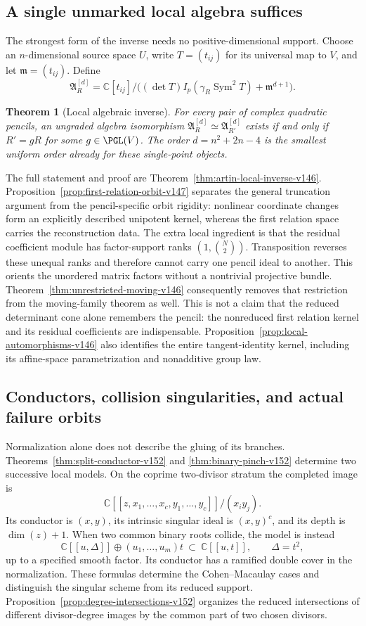 \documentclass[11pt,reqno]{amsart}
\numberwithin{equation}{section}
\newtheorem{theorem}{Theorem}[section]
\theoremstyle{definition}\newtheorem{definition}[theorem]{Definition}
\theoremstyle{remark}\newtheorem{remark}[theorem]{Remark}
\newcommand{\C}{\mathbb C}\newcommand{\Q}{\mathbb Q}
\DeclareMathOperator{\Sym}{Sym}\DeclareMathOperator{\Gr}{Gr}
\begin{document}
\subsection{A single unmarked local algebra suffices}
The strongest form of the inverse needs no positive-dimensional support.
Choose an \(n\)-dimensional source space \(U\), write \(T=(t_{ij})\)
for its universal map to \(V\), and let \(\mathfrak m=(t_{ij})\).
Define
\[
 \mathfrak A_R^{[d]}=
 \C[t_{ij}]/\bigl((\det T)I_p(\gamma_R\Sym^2T)
                                      +\mathfrak m^{d+1}\bigr).
\]
\begin{theorem}[Local algebraic inverse]\label{thm:principal-local-v146}
For every pair of complex quadratic pencils, an ungraded algebra
isomorphism \(\mathfrak A_R^{[d]}\simeq\mathfrak A_{R'}^{[d]}\)
exists if and only if \(R'=gR\) for some \(g\in\PGL(V)\).
The order \(d=n^2+2n-4\) is the smallest uniform order already for
these single-point objects.
\end{theorem}
The full statement and proof are
Theorem~\ref{thm:artin-local-inverse-v146}.  Proposition~\ref{prop:first-relation-orbit-v147}
separates the general truncation argument from the pencil-specific
orbit rigidity: nonlinear coordinate changes form an explicitly described
unipotent kernel, whereas the first relation space carries the
reconstruction data.  The extra local ingredient
is that the residual coefficient module has factor-support ranks
\((1,\binom N2)\).  Transposition reverses these unequal ranks and
therefore cannot carry one pencil ideal to another.  This orients the
unordered matrix factors without a nontrivial projective bundle.
Theorem~\ref{thm:unrestricted-moving-v146} consequently removes that
restriction from the moving-family theorem as well.  This is not a
claim that the reduced determinant cone alone remembers the pencil:
the nonreduced first relation kernel and its residual coefficients
are indispensable.  Proposition~\ref{prop:local-automorphisms-v146}
also identifies the entire tangent-identity kernel, including its
affine-space parametrization and nonadditive group law.

\subsection{Conductors, collision singularities, and actual failure orbits}
Normalization alone does not describe the gluing of its branches.
Theorems~\ref{thm:split-conductor-v152} and
\ref{thm:binary-pinch-v152} determine two successive local models.
On the coprime two-divisor stratum the completed image is
\[
       \C[[z,x_1,\ldots,x_c,y_1,\ldots,y_c]]/(x_i y_j).
\]
Its conductor is $(x,y)$, its intrinsic singular ideal is $(x,y)^c$,
and its depth is $\dim(z)+1$.  When two common binary roots collide,
the model is instead
\[
 \C[[u,\Delta]]\oplus(u_1,\ldots,u_m)t
          \ \subset\ \C[[u,t]],\qquad \Delta=t^2,
\]
up to a specified smooth factor.  Its conductor has a ramified
double cover in the normalization.  These formulas determine the
Cohen--Macaulay cases and distinguish the singular scheme from its
reduced support.  Proposition~\ref{prop:degree-intersections-v152}
organizes the reduced intersections of different divisor-degree
images by the common part of two chosen divisors.
\end{document}

